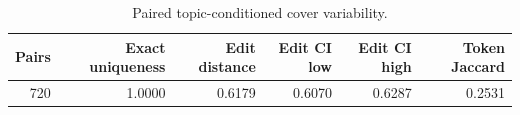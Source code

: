 \begin{table}
\caption{Paired topic-conditioned cover variability.}
\label{tab:v3_topic_variability}
\begin{tabular}{rrrrrr}
\toprule
Pairs & Exact uniqueness & Edit distance & Edit CI low & Edit CI high & Token Jaccard \\
\midrule
720 & 1.0000 & 0.6179 & 0.6070 & 0.6287 & 0.2531 \\
\bottomrule
\end{tabular}
\end{table}
